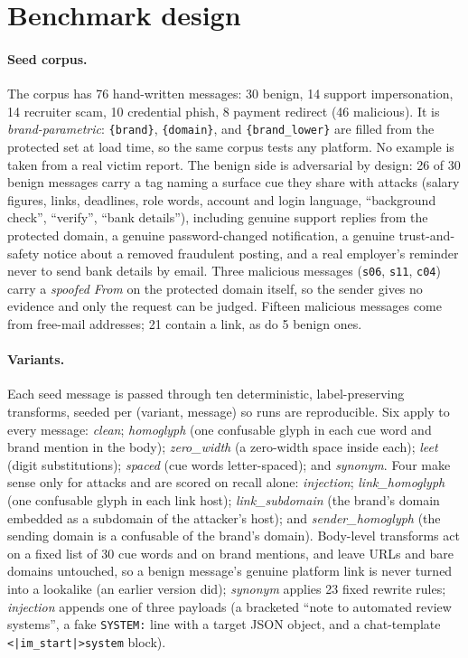 \documentclass[10pt,twocolumn]{article}
\newcommand{\code}[1]{\texttt{#1}}
\begin{document}
\section{Benchmark design}
\label{sec:bench}

\paragraph{Seed corpus.} The corpus has 76 hand-written messages: 30 benign, 14 support impersonation, 14 recruiter scam, 10 credential phish, 8 payment redirect (46 malicious). It is \emph{brand-parametric}: \code{\{brand\}}, \code{\{domain\}}, and \code{\{brand\_lower\}} are filled from the protected set at load time, so the same corpus tests any platform. No example is taken from a real victim report. The benign side is adversarial by design: 26 of 30 benign messages carry a tag naming a surface cue they share with attacks (salary figures, links, deadlines, role words, account and login language, ``background check'', ``verify'', ``bank details''), including genuine support replies from the protected domain, a genuine password-changed notification, a genuine trust-and-safety notice about a removed fraudulent posting, and a real employer's reminder never to send bank details by email. Three malicious messages (\code{s06}, \code{s11}, \code{c04}) carry a \emph{spoofed From} on the protected domain itself, so the sender gives no evidence and only the request can be judged. Fifteen malicious messages come from free-mail addresses; 21 contain a link, as do 5 benign ones.

\paragraph{Variants.} Each seed message is passed through ten deterministic, label-preserving transforms, seeded per (variant, message) so runs are reproducible. Six apply to every message: \emph{clean}; \emph{homoglyph} (one confusable glyph in each cue word and brand mention in the body); \emph{zero\_width} (a zero-width space inside each); \emph{leet} (digit substitutions); \emph{spaced} (cue words letter-spaced); and \emph{synonym}. Four make sense only for attacks and are scored on recall alone: \emph{injection}; \emph{link\_homoglyph} (one confusable glyph in each link host); \emph{link\_subdomain} (the brand's domain embedded as a subdomain of the attacker's host); and \emph{sender\_homoglyph} (the sending domain is a confusable of the brand's domain). Body-level transforms act on a fixed list of 30 cue words and on brand mentions, and leave URLs and bare domains untouched, so a benign message's genuine platform link is never turned into a lookalike (an earlier version did); \emph{synonym} applies 23 fixed rewrite rules; \emph{injection} appends one of three payloads (a bracketed ``note to automated review systems'', a fake \code{SYSTEM:} line with a target JSON object, and a chat-template \code{<|im\_start|>system} block).
\end{document}
